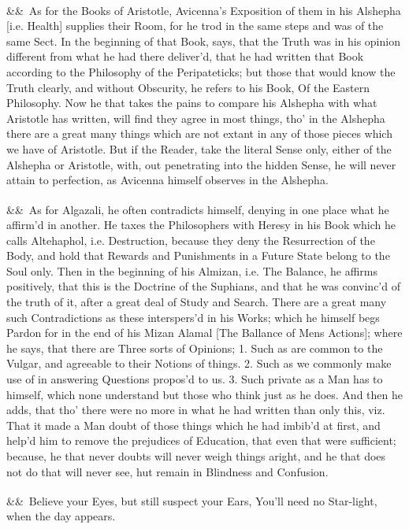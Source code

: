 \documentclass[12pt]{article}
\newcommand{\para}[1][]{\par\noindent\ifx&#1&\else\textsuperscript{\footnotesize #1}~\fi}
\begin{document}
\para As for the Books of Aristotle, Avicenna's Exposition of them in his Alshepha [i.e. Health] supplies their Room, for he trod in the same steps and was of the same Sect. In the beginning of that Book, says, that the Truth was in his opinion different from what he had there deliver'd, that he had written that Book according to the Philosophy of the Peripateticks; but those that would know the Truth clearly, and without Obscurity, he refers to his Book, Of the Eastern Philosophy. Now he that takes the pains to compare his Alshepha with what Aristotle has written, will find they agree in most things, tho' in the Alshepha there are a great many things which are not extant in any of those pieces which we have of Aristotle. But if the Reader, take the literal Sense only, either of the Alshepha or Aristotle, with, out penetrating into the hidden Sense, he will never attain to perfection, as Avicenna himself observes in the Alshepha.

\para As for Algazali, he often contradicts himself, denying in one place what he affirm'd in another. He taxes the Philosophers with Heresy in his Book which he calls Altehaphol, i.e. Destruction, because they deny the Resurrection of the Body, and hold that Rewards and Punishments in a Future State belong to the Soul only. Then in the beginning of his Almizan, i.e. The Balance, he affirms positively, that this is the Doctrine of the Suphians, and that he was convinc'd of the truth of it, after a great deal of Study and Search. There are a great many such Contradictions as these interspers'd in his Works; which he himself begs Pardon for in the end of his Mizan Alamal [The Ballance of Mens Actions]; where he says, that there are Three sorts of Opinions; 1. Such as are common to the Vulgar, and agreeable to their Notions of things. 2. Such as we commonly make use of in answering Questions propos'd to us. 3. Such private as a Man has to himself, which none understand but those who think just as he does. And then he adds, that tho' there were no more in what he had written than only this, viz. That it made a Man doubt of those things which he had imbib'd at first, and help'd him to remove the prejudices of Education, that even that were sufficient; because, he that never doubts will never weigh things aright, and he that does not do that will never see, hut remain in Blindness and Confusion.

\para Believe your Eyes, but still suspect your Ears, You'll need no Star-light, when the day appears.
\end{document}
